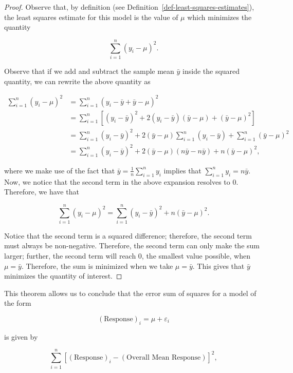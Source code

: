 \documentclass[
  letterpaper,
  DIV=11,
  numbers=noendperiod]{scrreprt}
\theoremstyle{definition}
\theoremstyle{definition}
\theoremstyle{plain}
\theoremstyle{remark}
\begin{document}
\begin{proof}
Observe that, by definition (see
Definition~\ref{def-least-squares-estimates}), the least squares
estimate for this model is the value of \(\mu\) which minimizes the
quantity

\[\sum_{i=1}^{n} \left(y_i - \mu\right)^2.\]

Observe that if we add and subtract the sample mean \(\bar{y}\) inside
the squared quantity, we can rewrite the above quantity as

\[
\begin{aligned}
  \sum_{i=1}^{n} \left(y_i - \mu\right)^2 
    &= \sum_{i=1}^{n} \left(y_i - \bar{y} + \bar{y} - \mu\right)^2 \\
    &= \sum_{i=1}^{n} \left[\left(y_i - \bar{y}\right)^2 + 2\left(y_i - \bar{y}\right)\left(\bar{y} - \mu\right) + \left(\bar{y} - \mu\right)^2\right] \\
    &= \sum_{i=1}^{n} \left(y_i - \bar{y}\right)^2 + 2\left(\bar{y} - \mu\right) \sum_{i=1}^{n}\left(y_i - \bar{y}\right) + \sum_{i=1}^{n}\left(\bar{y} - \mu\right)^2 \\
    &= \sum_{i=1}^{n} \left(y_i - \bar{y}\right)^2 + 2\left(\bar{y} - \mu\right) \left(n\bar{y} - n\bar{y}\right) + n\left(\bar{y} - \mu\right)^2, 
\end{aligned}
\]

where we make use of the fact that
\(\bar{y} = \frac{1}{n}\sum_{i=1}^{n} y_i\) implies that
\(\sum_{i=1}^{n} y_i = n\bar{y}\). Now, we notice that the second term
in the above expansion resolves to 0. Therefore, we have that

\[\sum_{i=1}^{n} \left(y_i - \mu\right)^2 = \sum_{i=1}^{n} \left(y_i - \bar{y}\right)^2 + n\left(\bar{y} - \mu\right)^2.\]

Notice that the second term is a squared difference; therefore, the
second term must always be non-negative. Therefore, the second term can
only make the sum larger; further, the second term will reach 0, the
smallest value possible, when \(\mu = \bar{y}\). Therefore, the sum is
minimized when we take \(\mu = \bar{y}\). This gives that \(\bar{y}\)
minimizes the quantity of interest.
\end{proof}

This theorem allows us to conclude that the error sum of squares for a
model of the form

\[(\text{Response})_i = \mu + \varepsilon_i\]

is given by

\[\sum_{i=1}^{n} \left[(\text{Response})_i - (\text{Overall Mean Response})\right]^2,\]
\end{document}
